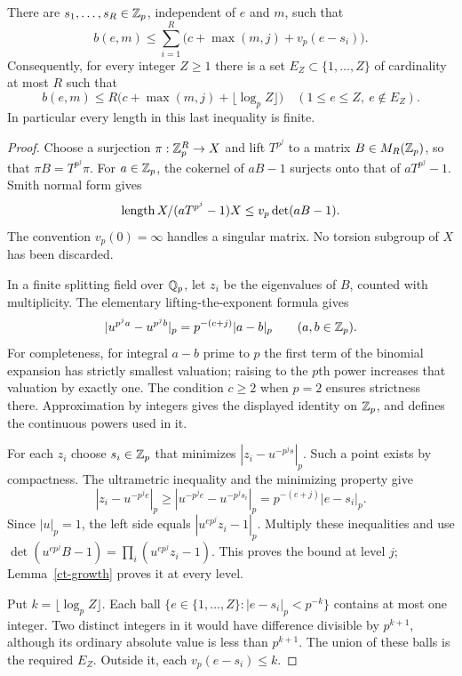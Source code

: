 \begin{proposition}
\label{ct-centres}
There are $s_1,\ldots,s_R\in\mathbb Z_p$, independent of $e$ and $m$,
such that
\[
 b(e,m)\le
       \sum_{i=1}^R\bigl(c+\max(m,j)+v_p(e-s_i)\bigr).
\]
Consequently, for every integer $Z\ge1$ there is a set
$E_Z\subset\{1,\ldots,Z\}$ of cardinality at most $R$ such that
\[
 b(e,m)\le R\bigl(c+\max(m,j)+\lfloor\log_p Z\rfloor\bigr)
       \quad(1\le e\le Z,\ e\notin E_Z).
\]
In particular every length in this last inequality is finite.
\end{proposition}

\begin{proof}
Choose a surjection $\pi:\mathbb Z_p^R\to X$ and lift $T^{p^j}$ to a
matrix $B\in M_R(\mathbb Z_p)$, so that $\pi B=T^{p^j}\pi$.
For $a\in\mathbb Z_p$, the cokernel of $aB-1$ surjects onto that of
$aT^{p^j}-1$. Smith normal form gives
\[
 \operatorname{length} X/(aT^{p^j}-1)X\le v_p\det(aB-1).
\]
The convention $v_p(0)=\infty$ handles a singular matrix.
No torsion subgroup of $X$ has been discarded.

In a finite splitting field over $\mathbb Q_p$, let $z_i$ be the
eigenvalues of $B$, counted with multiplicity. The elementary
lifting-the-exponent formula gives
\[
 |u^{p^j a}-u^{p^j b}|_p
          =p^{-(c+j)}|a-b|_p\qquad(a,b\in\mathbb Z_p).
\]
For completeness, for integral $a-b$ prime to $p$ the first term
of the binomial expansion has strictly smallest valuation; raising
to the $p$th power increases that valuation by exactly one.
The condition $c\ge2$ when $p=2$ ensures strictness there.
Approximation by integers gives the displayed identity on $\mathbb Z_p$,
and defines the continuous powers used in it.

For each $z_i$ choose $s_i\in\mathbb Z_p$ that minimizes
$|z_i-u^{-p^j s}|_p$. Such a point exists by compactness.
The ultrametric inequality and the minimizing property give
\[
 |z_i-u^{-p^j e}|_p
       \ge |u^{-p^j e}-u^{-p^j s_i}|_p
       =p^{-(c+j)}|e-s_i|_p.
\]
Since $|u|_p=1$, the left side equals
$|u^{ep^j}z_i-1|_p$. Multiply these inequalities and use
$\det(u^{ep^j}B-1)=\prod_i(u^{ep^j}z_i-1)$.
This proves the bound at level $j$; Lemma~\ref{ct-growth}
proves it at every level.

Put $k=\lfloor\log_p Z\rfloor$. Each ball
$\{e\in\{1,\ldots,Z\}:|e-s_i|_p<p^{-k}\}$ contains at most
one integer. Two distinct integers in it would have difference
divisible by $p^{k+1}$, although its ordinary absolute value is
less than $p^{k+1}$. The union of these balls is the required
$E_Z$. Outside it, each $v_p(e-s_i)\le k$.
\end{proof}

